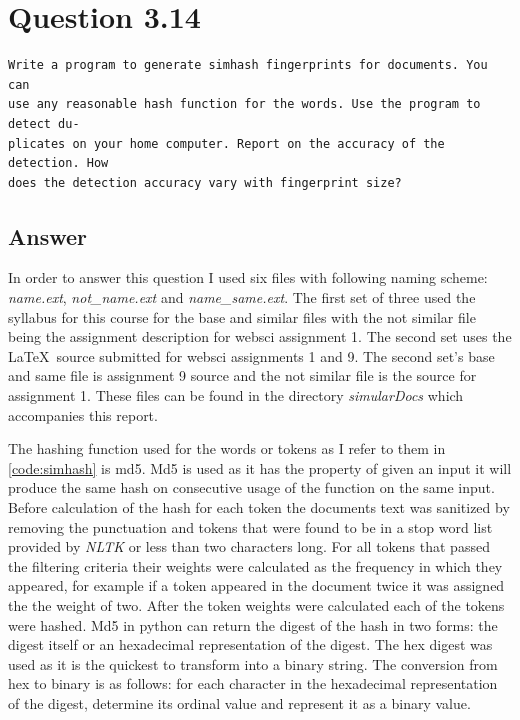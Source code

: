 \documentclass[11pt]{article}
\begin{document}
\section{Question 3.14}
\begin{verbatim}
Write a program to generate simhash fingerprints for documents. You can
use any reasonable hash function for the words. Use the program to detect du-
plicates on your home computer. Report on the accuracy of the detection. How
does the detection accuracy vary with fingerprint size?
\end{verbatim}
\subsection{Answer}
\setcounter{listing}{2}
In order to answer this question I used six files with following naming scheme: \emph{name.ext}, \emph{not\_name.ext} and \emph{name\_same.ext}. The first set of three used the syllabus for this course for the base and similar files with the not similar file being the assignment description for websci assignment 1. The second set uses the \LaTeX \ source submitted for websci assignments 1 and 9. The second set's base and same file is assignment 9 source and the not similar file is the source for assignment 1. These files can be found in the directory \emph{simularDocs} which accompanies this report. \newline

\noindent
The hashing function used for the words or tokens as I refer to them in \autoref{code:simhash} is md5. Md5 is used as it has the property of given an input it will produce the same hash on consecutive usage of the function on the same input. Before calculation of the hash for each token the documents text was sanitized by removing the punctuation and tokens that were found to be in a stop word list provided by \textit{NLTK} \cite{nltk} or less than two characters long. For all tokens that passed the filtering criteria their weights were calculated as the frequency in which they appeared, for example if a token appeared in the document twice it was assigned the the weight of two. After the token weights were calculated each of the tokens were hashed. Md5 in python can return the digest of the hash in two forms: the digest itself or an hexadecimal representation of the digest. The hex digest was used as it is the quickest to transform into a binary string. The conversion from hex to binary is as follows: for each character in the hexadecimal representation of the digest, determine its ordinal value and represent it as a binary value.\newline
\end{document}
